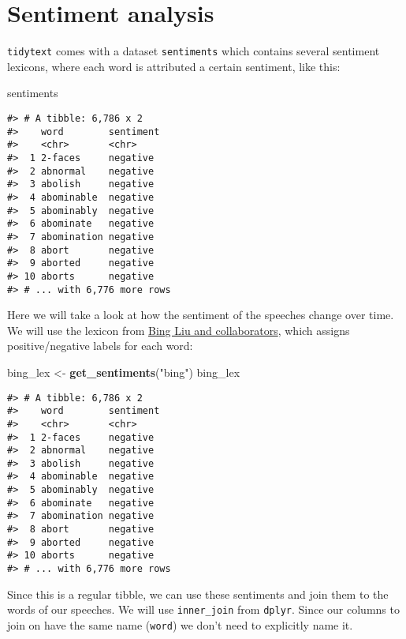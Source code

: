 \documentclass[]{book}
\newenvironment{Shaded}{\begin{snugshade}}{\end{snugshade}}
\newcommand{\KeywordTok}[1]{\textcolor[rgb]{0.13,0.29,0.53}{\textbf{#1}}}
\newcommand{\NormalTok}[1]{#1}
\newcommand{\StringTok}[1]{\textcolor[rgb]{0.31,0.60,0.02}{#1}}
\begin{document}
\hypertarget{sentiment-analysis}{%
\section{Sentiment analysis}\label{sentiment-analysis}}

\texttt{tidytext} comes with a dataset \texttt{sentiments} which contains several sentiment lexicons, where each word is attributed a certain sentiment, like this:

\begin{Shaded}
\begin{Highlighting}[]
\NormalTok{sentiments}
\end{Highlighting}
\end{Shaded}

\begin{verbatim}
#> # A tibble: 6,786 x 2
#>    word        sentiment
#>    <chr>       <chr>    
#>  1 2-faces     negative 
#>  2 abnormal    negative 
#>  3 abolish     negative 
#>  4 abominable  negative 
#>  5 abominably  negative 
#>  6 abominate   negative 
#>  7 abomination negative 
#>  8 abort       negative 
#>  9 aborted     negative 
#> 10 aborts      negative 
#> # ... with 6,776 more rows
\end{verbatim}

Here we will take a look at how the sentiment of the speeches change over time. We will use the lexicon from \href{https://www.cs.uic.edu/~liub/FBS/sentiment-analysis.html}{Bing Liu and collaborators}, which assigns positive/negative labels for each word:

\begin{Shaded}
\begin{Highlighting}[]
\NormalTok{bing_lex <-}\StringTok{ }\KeywordTok{get_sentiments}\NormalTok{(}\StringTok{"bing"}\NormalTok{)}
\NormalTok{bing_lex}
\end{Highlighting}
\end{Shaded}

\begin{verbatim}
#> # A tibble: 6,786 x 2
#>    word        sentiment
#>    <chr>       <chr>    
#>  1 2-faces     negative 
#>  2 abnormal    negative 
#>  3 abolish     negative 
#>  4 abominable  negative 
#>  5 abominably  negative 
#>  6 abominate   negative 
#>  7 abomination negative 
#>  8 abort       negative 
#>  9 aborted     negative 
#> 10 aborts      negative 
#> # ... with 6,776 more rows
\end{verbatim}

Since this is a regular tibble, we can use these sentiments and join them to the words of our speeches. We will use \texttt{inner\_join} from \texttt{dplyr}. Since our columns to join on have the same name (\texttt{word}) we don't need to explicitly name it.
\end{document}
